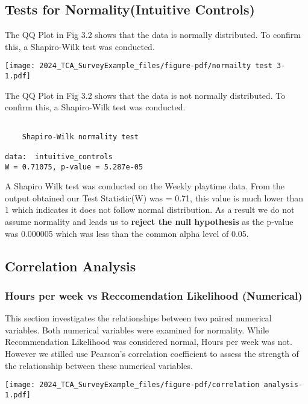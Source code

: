 \documentclass[
  letterpaper,
  DIV=11,
  numbers=noendperiod]{scrartcl}
\begin{document}
\subsection{Tests for Normality(Intuitive
Controls)}\label{tests-for-normalityintuitive-controls}

The QQ Plot in Fig 3.2 shows that the data is normally distributed. To
confirm this, a Shapiro-Wilk test was conducted.

\texttt{[image: 2024\_TCA\_SurveyExample\_files/figure-pdf/normailty test 3-1.pdf]}

The QQ Plot in Fig 3.2 shows that the data is not normally distributed.
To confirm this, a Shapiro-Wilk test was conducted.

\begin{verbatim}

    Shapiro-Wilk normality test

data:  intuitive_controls
W = 0.71075, p-value = 5.287e-05
\end{verbatim}

A Shapiro Wilk test was conducted on the Weekly playtime data. From the
output obtained our Test Statistic(W) was = 0.71, this value is much
lower than 1 which indicates it does not follow normal distribution. As
a result we do not assume normality and leads us to \textbf{reject the
null hypothesis} as the p-value was 0.000005 which was less than the
common alpha level of 0.05.

\subsection{Correlation Analysis}\label{correlation-analysis}

\subsubsection{Hours per week vs Reccomendation Likelihood
(Numerical)}\label{hours-per-week-vs-reccomendation-likelihood-numerical}

This section investigates the relationships between two paired numerical
variables. Both numerical variables were examined for normality. While
Recommendation Likelihood was considered normal, Hours per week was not.
However we stilled use Pearson's correlation coefficient to assess the
strength of the relationship between these numerical variables.

\texttt{[image: 2024\_TCA\_SurveyExample\_files/figure-pdf/correlation analysis-1.pdf]}
\end{document}
